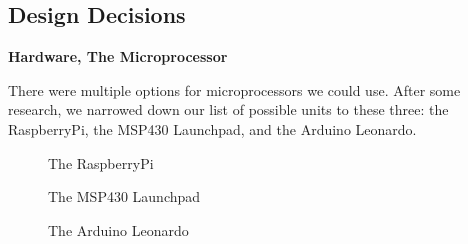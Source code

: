 \documentclass{report}
\begin{document}
\subsection*{Design Decisions}
\begin{center}
	\textbf{Hardware, The Microprocessor}
\end{center}
\indent
There were multiple options for microprocessors we could use. After some research, we narrowed down our list of possible units to these three: the RaspberryPi, the MSP430 Launchpad, and the Arduino Leonardo.
\newline
\begin{figure}[H]
	\caption{The RaspberryPi}
\end{figure}
\begin{figure}[H]
	\caption{The MSP430 Launchpad}
\end{figure}
\begin{figure}[H]
	\caption{The Arduino Leonardo}
\end{figure}
\end{document}
